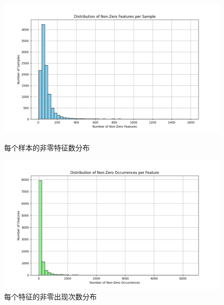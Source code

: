\documentclass[11pt,a4paper]{article}
\begin{document}
\begin{enumerate}
    \begin{figure}[htbp]
        \centering
        \begin{minipage}{0.48\textwidth}
            \centering
            \includegraphics[width=\textwidth]{../picture/non-zero_features_per_example.png}
            \caption{每个样本的非零特征数分布}
            \label{fig:non_zero_features_per_sample}
        \end{minipage}
        \hfill
        \begin{minipage}{0.48\textwidth}
            \centering
            \includegraphics[width=\textwidth]{../picture/non-zero_occurrences_per_example.png}
            \caption{每个特征的非零出现次数分布}
            \label{fig:non_zero_occurrences_per_feature}
        \end{minipage}
        
        \vspace{0.5cm}
        

\end{figure}
\end{enumerate}
\end{document}
